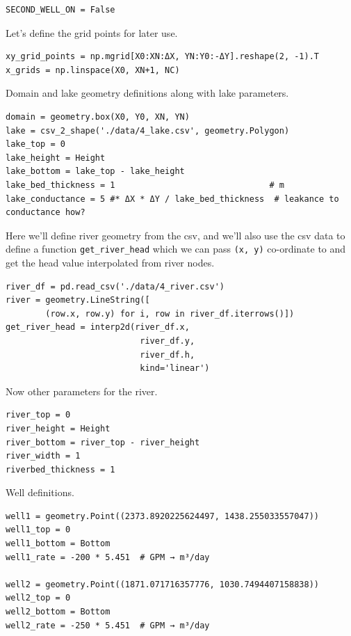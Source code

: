 \documentclass[titlepage,12pt]{unisubmission}
\begin{document}
\begin{verbatim}
SECOND_WELL_ON = False
\end{verbatim}

Let's define the grid points for later use.

\begin{verbatim}
xy_grid_points = np.mgrid[X0:XN:ΔX, YN:Y0:-ΔY].reshape(2, -1).T
x_grids = np.linspace(X0, XN+1, NC)
\end{verbatim}

Domain and lake geometry definitions along with lake parameters.

\begin{verbatim}
domain = geometry.box(X0, Y0, XN, YN)
lake = csv_2_shape('./data/4_lake.csv', geometry.Polygon)
lake_top = 0
lake_height = Height
lake_bottom = lake_top - lake_height
lake_bed_thickness = 1                               # m
lake_conductance = 5 #* ΔX * ΔY / lake_bed_thickness  # leakance to conductance how?
\end{verbatim}

Here we'll define river geometry from the csv, and we'll also use the csv data to define a function \texttt{get\_river\_head} which we can pass \texttt{(x, y)} co-ordinate to and get the head value interpolated from river nodes.

\begin{verbatim}
river_df = pd.read_csv('./data/4_river.csv')
river = geometry.LineString([
        (row.x, row.y) for i, row in river_df.iterrows()])
get_river_head = interp2d(river_df.x,
                           river_df.y,
                           river_df.h,
                           kind='linear')
\end{verbatim}

Now other parameters for the river.

\begin{verbatim}
river_top = 0
river_height = Height
river_bottom = river_top - river_height
river_width = 1
riverbed_thickness = 1
\end{verbatim}

Well definitions.

\begin{verbatim}
well1 = geometry.Point((2373.8920225624497, 1438.255033557047))
well1_top = 0
well1_bottom = Bottom
well1_rate = -200 * 5.451  # GPM → m³/day

well2 = geometry.Point((1871.071716357776, 1030.7494407158838))
well2_top = 0
well2_bottom = Bottom
well2_rate = -250 * 5.451  # GPM → m³/day
\end{verbatim}
\end{document}
